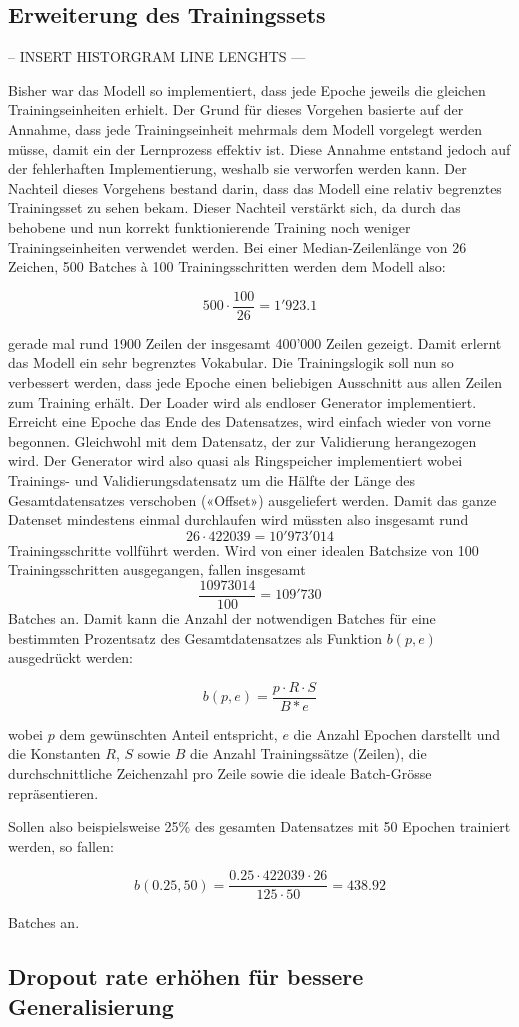 \subsection{Erweiterung des Trainingssets}
\label{sec:enhancing-training-set}

-- INSERT HISTORGRAM LINE LENGHTS ---

Bisher war das Modell so implementiert, dass jede Epoche jeweils die gleichen Trainingseinheiten erhielt.
Der Grund für dieses Vorgehen basierte auf der Annahme, dass jede Trainingseinheit mehrmals dem Modell vorgelegt werden müsse, damit
ein der Lernprozess effektiv ist.
Diese Annahme entstand jedoch auf der fehlerhaften Implementierung, weshalb sie verworfen werden kann.
Der Nachteil dieses Vorgehens bestand darin, dass das Modell eine relativ begrenztes Trainingsset zu sehen bekam.
Dieser Nachteil verstärkt sich, da durch das behobene und nun korrekt funktionierende Training noch weniger Trainingseinheiten verwendet werden.
Bei einer Median-Zeilenlänge von 26 Zeichen, 500 Batches à 100 Trainingsschritten werden dem Modell also:

\[ 500 \cdot \frac{100}{26} = 1'923.1 \]

gerade mal rund 1900 Zeilen der insgesamt 400'000 Zeilen gezeigt.
Damit erlernt das Modell ein sehr begrenztes Vokabular.
Die Trainingslogik soll nun so verbessert werden, dass jede Epoche einen beliebigen Ausschnitt aus allen Zeilen zum Training erhält.
Der Loader wird als endloser Generator implementiert.
Erreicht eine Epoche das Ende des Datensatzes, wird einfach wieder von vorne begonnen.
Gleichwohl mit dem Datensatz, der zur Validierung herangezogen wird.
Der Generator wird also quasi als Ringspeicher implementiert wobei Trainings- und Validierungsdatensatz um die Hälfte der Länge des Gesamtdatensatzes
verschoben («Offset») ausgeliefert werden.
Damit das ganze Datenset mindestens einmal durchlaufen wird müssten also insgesamt rund \[ 26 \cdot 422039 = 10'973'014 \] Trainingsschritte vollführt werden.
Wird von einer idealen Batchsize von 100 Trainingsschritten ausgegangen, fallen insgesamt \[ \frac{10973014}{100} = 109'730 \] Batches an.
Damit kann die Anzahl der notwendigen Batches für eine bestimmten Prozentsatz des Gesamtdatensatzes als Funktion $ b(p, e) $ ausgedrückt werden:

\[ b(p, e) = \frac{p \cdot R \cdot S}{B * e} \]

wobei $ p $ dem gewünschten Anteil entspricht, $ e $ die Anzahl Epochen darstellt und die Konstanten $ R $, $ S $ sowie $ B $ die Anzahl Trainingssätze (Zeilen), die durchschnittliche Zeichenzahl pro Zeile sowie
die ideale Batch-Grösse repräsentieren.

Sollen also beispielsweise 25\% des gesamten Datensatzes mit 50 Epochen trainiert werden, so fallen:

\[ b(0.25, 50) = \frac{0.25 \cdot 422039 \cdot 26}{125 \cdot 50} = 438.92 \]

Batches an.


\subsection{Dropout rate erhöhen für bessere Generalisierung}
\label{subsec:enhance-dropout-rate}